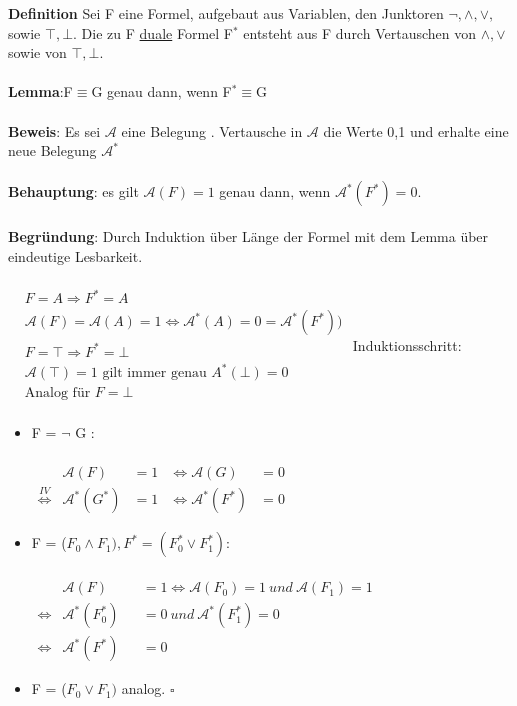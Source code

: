\documentclass[a4paper]{scrartcl}
\begin{document}
\textbf{Definition} Sei F eine Formel, aufgebaut aus Variablen, den Junktoren $\neg, \land, \lor,$ sowie $\top,\bot$. Die zu F \underline{duale} Formel F$^*$ entsteht aus F durch Vertauschen von $\land, \lor$ sowie von $\top, \bot$. \\ \\
\textbf{Lemma}:F$\equiv$G genau dann, wenn F$^* \equiv$G\\ \\
\textbf{Beweis}: Es sei $\mathcal{A}$ eine Belegung . Vertausche in $\mathcal{A}$ die Werte 0,1 und erhalte eine neue Belegung $\mathcal{A}^*$ \\ \\
\textbf{Behauptung}: es gilt $\mathcal{A}(F)=1$ genau dann, wenn $\mathcal{A}^*(F^*)=0$.\\ \\
\textbf{Begründung}: Durch Induktion über Länge der Formel mit dem Lemma über eindeutige Lesbarkeit.\\ \\
$\begin{aligned}
&F = A\Rightarrow F^*=A\\
&\mathcal{A}(F) = \mathcal{A}(A)=1 \Leftrightarrow \mathcal{A}^*(A)=0=\mathcal{A}^*(F^*))\\
&F=\top \Rightarrow F^*=\bot\\
&\mathcal{A}(\top) = 1\text{ gilt immer genau } A^*(\bot)=0\\ 
&\text{Analog für }F=\bot\\
\end{aligned}$
Induktionsschritt:\\
\begin{itemize}
\item F = $\neg$ G : \\ \\
$\begin{aligned}
&\mathcal{A}(F) &= 1 &\Leftrightarrow \mathcal{A}(G) &= 0\\
\overset{IV}{\Leftrightarrow} &\mathcal{A}^*(G^*) &= 1 &\Leftrightarrow \mathcal{A}^*(F^*) &= 0 \end{aligned}$
\item F = ($F_0 \land F_1) , F^*=(F_0^*\lor F_1^*)$:\\ \\
$\begin{aligned}
&\mathcal{A}(F) &&= 1 \Leftrightarrow \mathcal{A}(F_0)=1 ~und~\mathcal{A}(F_1)=1\\
\Leftrightarrow &\mathcal{A}^*(F_0^*) &&= 0 ~und ~\mathcal{A}^*(F_1^*) = 0\\
\Leftrightarrow &\mathcal{A}^*(F^*) &&= 0 \end{aligned}$\\
\item F = ($F_0 \lor F_1)$ analog. $\square$\\ 
\end{itemize}
\end{document}
